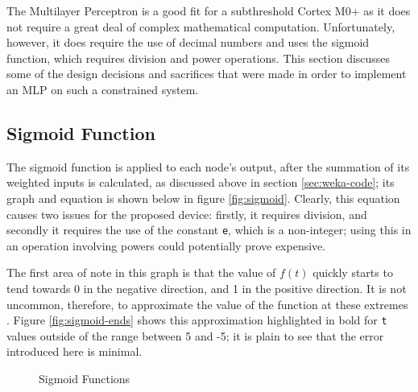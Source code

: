 
The Multilayer Perceptron is a good fit for a subthreshold Cortex M0+ as it does not require a great deal of complex mathematical computation. Unfortunately, however, it does require the use of decimal numbers and uses the sigmoid function, which requires division and power operations. This section discusses some of the design decisions and sacrifices that were made in order to implement an MLP on such a constrained system.

\subsection{Sigmoid Function}
The sigmoid function is applied to each node's output, after the summation of its weighted inputs is calculated, as discussed above in section \ref{sec:weka-code}; its graph and equation is shown below in figure \ref{fig:sigmoid}. Clearly, this equation causes two issues for the proposed device: firstly, it requires division, and secondly it requires the use of the constant \verb|e|, which is a non-integer; using this in an operation involving powers could potentially prove expensive.

The first area of note in this graph is that the value of $f(t)$ quickly starts to tend towards 0 in the negative direction, and 1 in the positive direction. It is not uncommon, therefore, to approximate the value of the function at these extremes \cite{sigmoid_approx}. Figure \ref{fig:sigmoid-ends} shows this approximation highlighted in bold for \verb|t| values outside of the range between 5 and -5; it is plain to see that the error introduced here is minimal.

\begin{figure}[!h]
    \centering
    \caption{Sigmoid Functions \label{fig:sigmoid-options}}
\end{figure}

